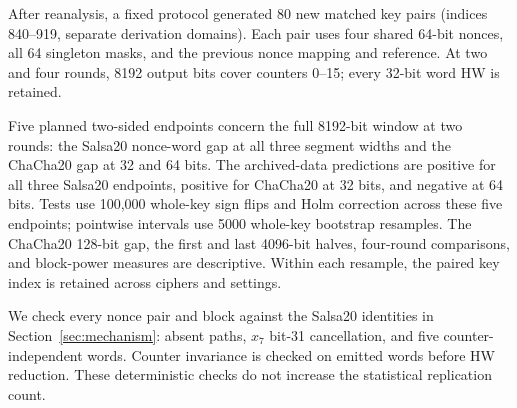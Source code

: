 After reanalysis, a fixed protocol generated 80 new matched key pairs (indices 840--919, separate derivation domains). Each pair uses four shared 64-bit nonces, all 64 singleton masks, and the previous nonce mapping and reference. At two and four rounds, 8192 output bits cover counters 0--15; every 32-bit word HW is retained.

Five planned two-sided endpoints concern the full 8192-bit window at two rounds: the Salsa20 nonce-word gap at all three segment widths and the ChaCha20 gap at 32 and 64 bits. The archived-data predictions are positive for all three Salsa20 endpoints, positive for ChaCha20 at 32 bits, and negative at 64 bits. Tests use 100,000 whole-key sign flips and Holm correction across these five endpoints; pointwise intervals use 5000 whole-key bootstrap resamples. The ChaCha20 128-bit gap, the first and last 4096-bit halves, four-round comparisons, and block-power measures are descriptive. Within each resample, the paired key index is retained across ciphers and settings.

We check every nonce pair and block against the Salsa20 identities in Section~\ref{sec:mechanism}: absent paths, $x_7$ bit-31 cancellation, and five counter-independent words. Counter invariance is checked on emitted words before HW reduction. These deterministic checks do not increase the statistical replication count.
